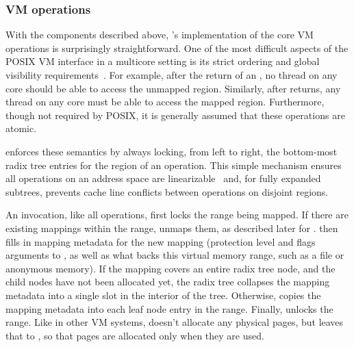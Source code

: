 \subsubsection{VM operations}
\label{sec:radixvm:ops}

With the components described above, \vm's implementation of the core
VM operations is surprisingly straightforward.
%
One of the most difficult aspects of the POSIX VM interface in a
multicore setting is its strict ordering and global visibility
requirements~\cite{clements:bonsai}.  For example, after the return
of an , no thread on any core should be able to access
the unmapped
region.  Similarly, after  returns, any thread on any core
must be able to access the mapped region.  Furthermore, though not
required by POSIX, it is generally assumed that these operations are
atomic.

\vm enforces these semantics by always locking, from left to right,
the bottom-most radix tree entries for the region of an operation.
This simple mechanism ensures all operations on an address space are
linearizable~\cite{herlihy:linearizability} and, for fully expanded
subtrees, prevents cache line conflicts between operations on disjoint
regions.


An  invocation, like all \vm operations, first locks the
range being mapped.
%
If there are existing mappings within the
range,  unmaps them, as described later for .
 then fills in mapping metadata for the new mapping (protection
level and flags arguments to , as well as what backs this virtual
memory range, such as a file or anonymous memory).  If the mapping covers
an entire radix tree node, and the child nodes have not been allocated
yet, the radix tree collapses the mapping metadata into a single slot
in the interior of the tree.
Otherwise, \vm copies the mapping metadata into each leaf node entry in
the range.  Finally, \vm unlocks the range.  Like in other VM systems,
doesn't allocate any physical pages, but leaves that to ,
so that pages are allocated only when they are used.

